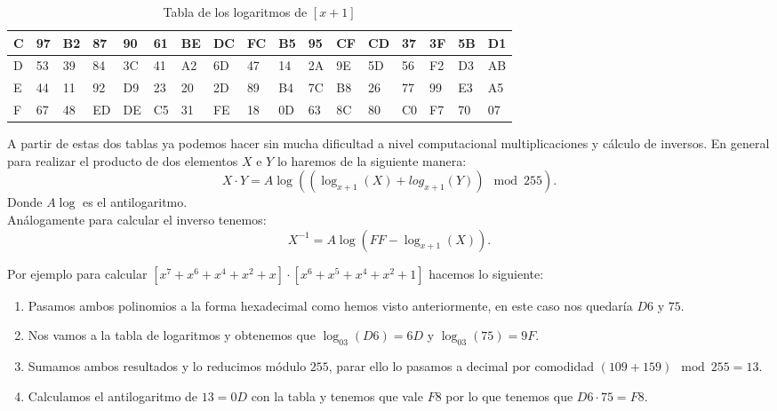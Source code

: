 \begin{table}[!htb]
{\begin{tabular}{|l|l|l|l|l|l|l|l|l|l|l|l|l|l|l|l|l|}
C & 97 & B2 & 87 & 90 & 61 & BE & DC & FC & B5 & 95 & CF & CD & 37 & 3F & 5B & D1 \\ \hline
D & 53 & 39 & 84 & 3C & 41 & A2 & 6D & 47 & 14 & 2A & 9E & 5D & 56 & F2 & D3 & AB \\ \hline
E & 44 & 11 & 92 & D9 & 23 & 20 & 2D & 89 & B4 & 7C & B8 & 26 & 77 & 99 & E3 & A5 \\ \hline
F & 67 & 48 & ED & DE & C5 & 31 & FE & 18 & 0D & 63 & 8C & 80 & C0 & F7 & 70 & 07 \\ \hline
\end{tabular}}
	\label{potenciasinversas}
\caption{Tabla de los logaritmos de $[x+1]$}
\end{table}
\newpage
A partir de estas dos tablas ya podemos hacer sin mucha dificultad a nivel computacional multiplicaciones y cálculo de inversos. En general para realizar el producto de dos elementos $X$ e $Y$ lo haremos de la siguiente manera:
$$
	X\cdot Y = A\log((\log_{x+1}(X)+log_{x+1}(Y)) \mod 255).
$$
Donde $A\log$ es el antilogaritmo.\\
Análogamente para calcular el inverso tenemos:
$$
	X^{-1} = A\log(FF-\log_{x+1}(X)).
$$

Por ejemplo para calcular $[x^7+x^6+x^4+x^2+x]\cdot[x^6+x^5+x^4+x^2+1]$ hacemos lo siguiente:
\begin{enumerate}
	\item Pasamos ambos polinomios a la forma hexadecimal como hemos visto anteriormente, en este caso nos quedaría $D6$ y $75$.
	\item Nos vamos a la tabla de logaritmos y obtenemos que $\log_{03}(D6)=6D$ y $\log_{03}(75)=9F$.
	\item Sumamos ambos resultados y lo reducimos módulo $255$, parar ello lo pasamos a decimal por comodidad $(109+159)\mod255=13$.
	\item Calculamos el antilogaritmo de $13=0D$ con la tabla y tenemos que vale $F8$ por lo que tenemos que $D6\cdot 75 = F8$.
\end{enumerate}

